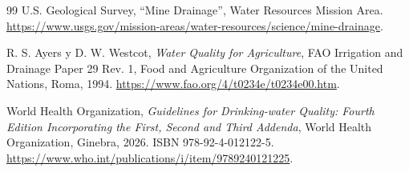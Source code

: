 \documentclass[11pt,a4paper]{article}
\begin{document}
\begin{thebibliography}{99}
U.S. Geological Survey,
``Mine Drainage'',
Water Resources Mission Area.
\url{https://www.usgs.gov/mission-areas/water-resources/science/mine-drainage}.


R. S. Ayers y D. W. Westcot,
\emph{Water Quality for Agriculture},
FAO Irrigation and Drainage Paper 29 Rev. 1,
Food and Agriculture Organization of the United Nations,
Roma, 1994.
\url{https://www.fao.org/4/t0234e/t0234e00.htm}.

World Health Organization,
\emph{Guidelines for Drinking-water Quality:
Fourth Edition Incorporating the First, Second and Third Addenda},
World Health Organization,
Ginebra, 2026.
ISBN 978-92-4-012122-5.
\url{https://www.who.int/publications/i/item/9789240121225}.

\end{thebibliography}
\end{document}

